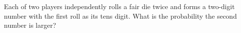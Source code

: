 Each of two players independently rolls a fair die twice and forms a two-digit number with the first roll as its tens digit. What is the probability the second number is larger?
